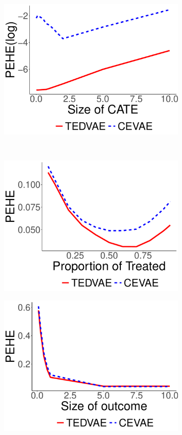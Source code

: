 \documentclass[letterpaper]{article} %
\begin{document}
\begin{figure}[!t]
\begin{subfigure}{0.15\textwidth}
		\includegraphics[width=\linewidth]{synthetic2_gamma.pdf}
	\end{subfigure}	
	\\
	\begin{subfigure}{0.15\textwidth}
		\includegraphics[width=\linewidth]{synthetic1_alpha.pdf}
	\end{subfigure}
	\begin{subfigure}{0.15\textwidth}
		\includegraphics[width=\linewidth]{synthetic1_beta.pdf}

\end{subfigure}
\end{figure}
\end{document}

